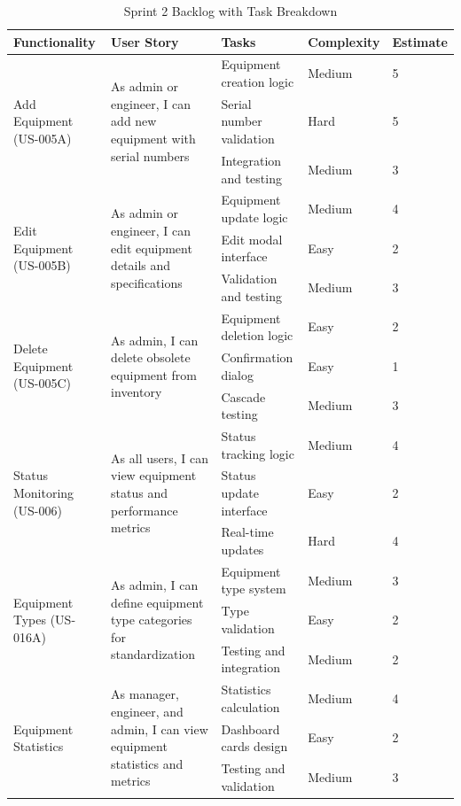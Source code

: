 \begin{table}[H]
\centering
\small
\begin{tabular}{|p{2.5cm}|p{4cm}|p{3.2cm}|p{2.2cm}|p{1.5cm}|}
\hline
\textbf{Functionality} & \textbf{User Story} & \textbf{Tasks} & \textbf{Complexity} & \textbf{Estimate} \\
\hline

\multirow{3}{2.5cm}{Add Equipment (US-005A)} & 
\multirow{3}{4cm}{As admin or engineer, I can add new equipment with serial numbers}
& Equipment creation logic & Medium & 5 \\
\cline{3-5}
& & Serial number validation & Hard & 5 \\
\cline{3-5}
& & Integration and testing & Medium & 3 \\
\hline

\multirow{3}{2.5cm}{Edit Equipment (US-005B)} & 
\multirow{3}{4cm}{As admin or engineer, I can edit equipment details and specifications}
& Equipment update logic & Medium & 4 \\
\cline{3-5}
& & Edit modal interface & Easy & 2 \\
\cline{3-5}
& & Validation and testing & Medium & 3 \\
\hline

\multirow{3}{2.5cm}{Delete Equipment (US-005C)} & 
\multirow{3}{4cm}{As admin, I can delete obsolete equipment from inventory}
& Equipment deletion logic & Easy & 2 \\
\cline{3-5}
& & Confirmation dialog & Easy & 1 \\
\cline{3-5}
& & Cascade testing & Medium & 3 \\
\hline

\multirow{3}{2.5cm}{Status Monitoring (US-006)} & 
\multirow{3}{4cm}{As all users, I can view equipment status and performance metrics}
& Status tracking logic & Medium & 4 \\
\cline{3-5}
& & Status update interface & Easy & 2 \\
\cline{3-5}
& & Real-time updates & Hard & 4 \\
\hline

\multirow{3}{2.5cm}{Equipment Types (US-016A)} & 
\multirow{3}{4cm}{As admin, I can define equipment type categories for standardization}
& Equipment type system & Medium & 3 \\
\cline{3-5}
& & Type validation & Easy & 2 \\
\cline{3-5}
& & Testing and integration & Medium & 2 \\
\hline

\multirow{3}{2.5cm}{Equipment Statistics} & 
\multirow{3}{4cm}{As manager, engineer, and admin, I can view equipment statistics and metrics}
& Statistics calculation & Medium & 4 \\
\cline{3-5}
& & Dashboard cards design & Easy & 2 \\
\cline{3-5}
& & Testing and validation & Medium & 3 \\
\hline

\end{tabular}
\caption{Sprint 2 Backlog with Task Breakdown}
\label{tab:sprint2_backlog}
\end{table}

